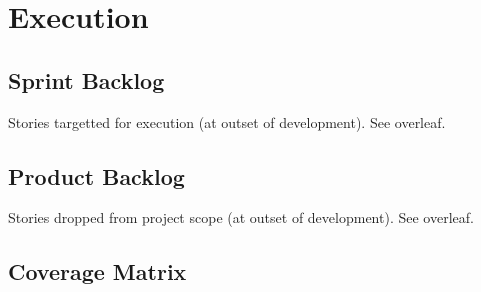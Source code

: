 \chapter{Execution}\label{appendix_execution}

\section{Sprint Backlog}\label{appendix_sprint_backlog}

Stories targetted for execution (at outset of development). See overleaf.



\section{Product Backlog}\label{appendix_product_backlog}

Stories dropped from project scope (at outset of development). See overleaf.



\section{Coverage Matrix}\label{appendix_coverage_matrix}

